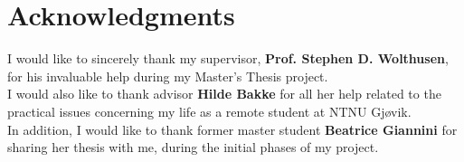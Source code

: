 


\chapter*{Acknowledgments}


I would like to sincerely thank my supervisor, \textbf{Prof. Stephen D. Wolthusen},  for his  invaluable help during my Master's Thesis project.  \\

I would also like to thank advisor \textbf{Hilde Bakke} for all her help related to the practical issues concerning my  life as a remote student at NTNU Gj\o vik. \\ 


In addition, I would like to thank former master student \textbf{Beatrice Giannini} for sharing her thesis with me, during the initial phases of my project. \\





    
